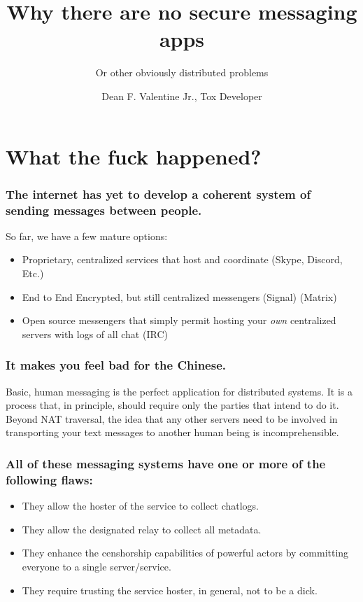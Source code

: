 \documentclass{beamer}
\title[crisis]{Why there are no secure messaging apps}
\subtitle{Or other obviously distributed problems}
\author[Author, Anders]{Dean F. Valentine Jr., Tox Developer}
\begin{document}
  \begin{frame}
      \frame{\titlepage}
  \end{frame}
  \section{What the fuck happened?}
  \begin{frame}
      \frame{\sectionpage}
  \end{frame}
  \begin{frame}
      \frametitle{The internet has yet to develop a coherent system of sending messages between people.}
      So far, we have a few mature options:
      \begin{itemize}
          \item Proprietary, centralized services that host and coordinate (Skype, Discord, Etc.)
          \item End to End Encrypted, but still centralized messengers (Signal) (Matrix)
          \item Open source messengers that simply permit hosting your {\it own\/} centralized servers with logs of all chat (IRC)
      \end{itemize}
  \end{frame}
  \begin{frame}
      \frametitle{It makes you feel bad for the Chinese.}
      Basic, human messaging is the perfect application for distributed systems. It is a process
      that, in principle, should require only the parties that intend to do it. Beyond NAT traversal, the
      idea that any other servers need to be involved in transporting your text messages to another human
      being is incomprehensible.
  \end{frame}
  \begin{frame}
      \frametitle{All of these messaging systems have one or more of the following flaws:}
      \begin{itemize}
          \item They allow the hoster of the service to collect chatlogs.
          \item They allow the designated relay to collect all metadata.
          \item They enhance the censhorship capabilities of powerful actors by committing everyone to a single server/service.
          \item They require trusting the service hoster, in general, not to be a dick.
      \end{itemize}
  \end{frame}
\end{document}
